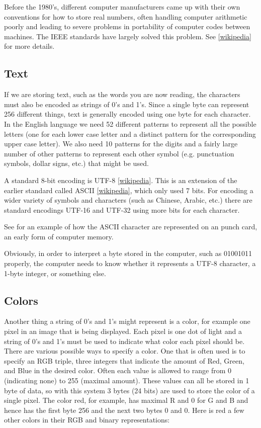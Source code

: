 \documentclass[letterpaper,10pt,english]{sphinxmanual}
\begin{document}
Before the 1980's, different computer manufacturers came up with their own
conventions for how to store real numbers, often handling computer
arithmetic poorly and leading to severe problems in portability of computer
codes between machines.  The IEEE standards have largely solved this
problem.
See \href{http://en.wikipedia.org/wiki/IEEE\_floating\_point}{{[}wikipedia{]}} for more
details.


\subsection{Text}
\label{memory:text}
If we are storing text, such as the words you are now reading, the
characters must also be encoded as strings of 0's and 1's.  Since a single
byte can represent 256 different things, text is generally encoded using one
byte for each character.  In the English language we need 52 different
patterns to represent all the possible letters (one for each lower case
letter and a distinct pattern for the corresponding upper case letter).  We
also need 10 patterns for the digits and a fairly large number of other
patterns to represent each other symbol (e.g. punctuation symbols, dollar
signs, etc.) that might be used.

A standard 8-bit encoding is UTF-8
\href{http://en.wikipedia.org/wiki/UTF-8}{{[}wikipedia{]}}.
This is an extension of the earlier standard called ASCII
\href{http://en.wikipedia.org/wiki/ASCII}{{[}wikipedia{]}}, which only used 7 bits.
For encoding a wider variety of symbols and characters (such as
Chinese, Arabic, etc.) there are standard encodings UTF-16 and
UTF-32 using more bits for each character.

See {\hyperref[punchcard:punchcard]{}} for an example of how the ASCII character are
represented on an punch card, an early form of computer memory.

Obviously, in order to interpret a byte stored in the computer, such as
01001011 properly, the computer needs to know whether it represents a UTF-8
character, a 1-byte integer, or something else.


\subsection{Colors}
\label{memory:colors}\label{memory:id5}
Another thing a string of 0's and 1's
might represent is a color, for example one pixel in an image that is
being displayed.  Each pixel is one dot of light and a string of 0's and 1's
must be used to indicate what color each pixel should be.  There are various
possible ways to specify a color.  One that is often used is to specify an
RGB triple, three integers that indicate the amount of Red, Green, and Blue
in the desired color.  Often each value is allowed to range from 0
(indicating none) to 255 (maximal amount). These values can all be stored in
1 byte of data, so with this system 3 bytes (24 bits) are used to store the
color of a single pixel.  The color red, for example, has maximal R and 0
for G and B and hence has the first byte 256 and the next two bytes 0 and 0.
Here is red a few other colors in their RGB and binary representations:
\end{document}
